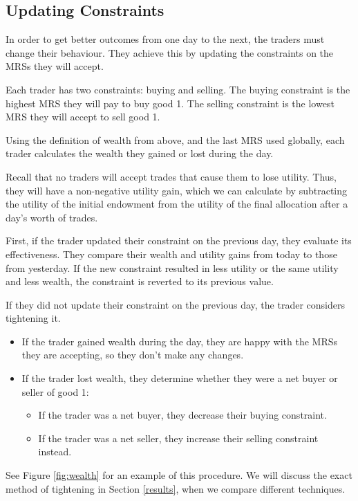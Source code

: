 \documentclass[12pt,a4paper,titlepage]{article}
\begin{document}
\subsection{Updating Constraints}
In order to get better outcomes from one day to the next, the traders must change their behaviour.
They achieve this by updating the constraints on the MRSs they will accept.

Each trader has two constraints: buying and selling.
The buying constraint is the highest MRS they will pay to buy good 1.
The selling constraint is the lowest MRS they will accept to sell good 1.

Using the definition of wealth from above, and the last MRS used globally, each trader calculates the wealth they gained or lost during the day.

Recall that no traders will accept trades that cause them to lose utility. 
Thus, they will have a non-negative utility gain, which we can calculate by subtracting the utility of the initial endowment from the utility of the final allocation after a day's worth of trades.

First, if the trader updated their constraint on the previous day, they evaluate its effectiveness.
They compare their wealth and utility gains from today to those from yesterday.
If the new constraint resulted in less utility or the same utility and less wealth, the constraint is reverted to its previous value.

If they did not update their constraint on the previous day, the trader considers tightening it.
\begin{itemize}
  \item If the trader gained wealth during the day, they are happy with the MRSs they are accepting, so they don't make any changes.
  \item If the trader lost wealth, they determine whether they were a net buyer or seller of good 1:
    \begin{itemize}
      \item If the trader was a net buyer, they decrease their buying constraint.
      \item If the trader was a net seller, they increase their selling constraint instead.
    \end{itemize}
\end{itemize}

See Figure \ref{fig:wealth} for an example of this procedure.
We will discuss the exact method of tightening in Section \ref{results}, when we compare different techniques.
\end{document}
